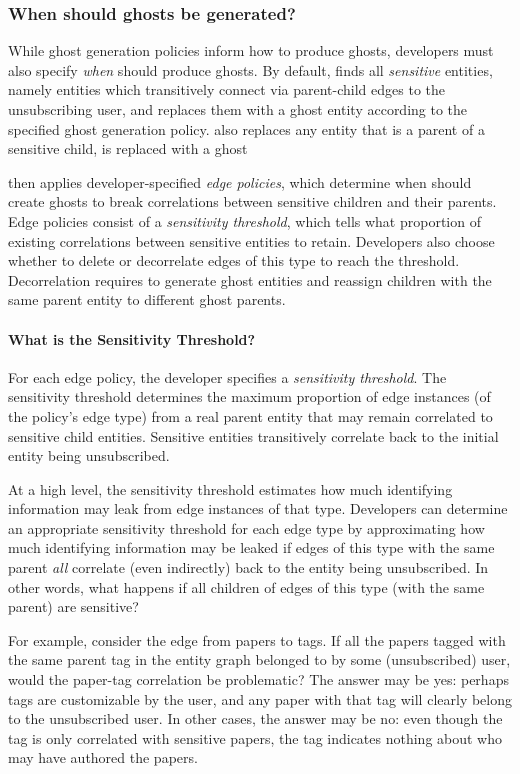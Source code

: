 \subsubsection{When should ghosts be generated?}
\label{design:edgepol}
While ghost generation policies inform \proto how to produce ghosts, developers must also specify
\emph{when} \proto should produce ghosts. 
By default, \proto finds all \emph{sensitive} entities,
namely entities which transitively connect via parent-child edges to the unsubscribing user, and
replaces them with a ghost entity according to the specified ghost generation policy. \proto also
replaces any entity that is a parent of a sensitive child, is replaced with a ghost

\proto then applies developer-specified \emph{edge policies}, which determine when \proto should
create ghosts to break correlations between sensitive children and their parents.
Edge policies consist of a \emph{sensitivity threshold}, which tells \proto what
proportion of existing correlations between sensitive entities to retain. Developers also choose
whether to delete or decorrelate edges of this type to reach the threshold. Decorrelation requires
\proto to generate ghost entities and reassign children with the same parent entity to different
ghost parents.

\paragraph{What is the Sensitivity Threshold?}
For each edge policy, the developer specifies a \emph{sensitivity
threshold}. 
%
The sensitivity threshold determines the maximum proportion of edge instances (of the policy's edge
type) from a real parent entity that may remain correlated to sensitive child entities.
Sensitive entities transitively correlate back to the initial entity being unsubscribed. 

At a high level, the sensitivity threshold estimates how much identifying information may leak from
edge instances of that type. Developers can determine an appropriate sensitivity threshold for each
edge type by approximating how much identifying information may be leaked if edges of this type with
the same parent \emph{all} correlate (even indirectly) back to the entity being unsubscribed. In
other words, what happens if all children of edges of this type (with the same parent) are
sensitive?

For example, consider the edge from papers to tags. If all the papers tagged with the same parent
tag in the entity graph belonged to by some (unsubscribed) user, would the paper-tag correlation be
problematic? The answer may be yes: perhaps tags are customizable by the user, and any paper with
that tag will clearly belong to the unsubscribed user. In other cases, the answer may be no: even
though the tag is only correlated with sensitive papers, the tag indicates nothing about who may
have authored the papers.

